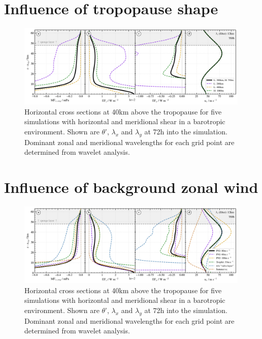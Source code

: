 \section{Influence of tropopause shape}
\begin{figure}[tbp]
    \centering
    \includegraphics[width=0.99\textwidth]{figures_q3D/TD-zprofiles-translbq3D_shape-T60h-avg.png}
    \caption{Horizontal cross sections at 40km above the tropopause for five simulations with horizontal and meridional shear in a barotropic environment. Shown are $\theta$', $\lambda_x$ and $\lambda_y$ at 72h into the simulation. Dominant zonal and meridional wavelengths for each grid point are determined from wavelet analysis.}
    \label{fig:q3D_shape}
\end{figure}


\section{Influence of background zonal wind}
\begin{figure}[tbp]
    \centering
    \includegraphics[width=0.99\textwidth]{figures_q3D/TD-zprofiles-translbq3D_wind-T60h-avg.png}
    \caption{Horizontal cross sections at 40km above the tropopause for five simulations with horizontal and meridional shear in a barotropic environment. Shown are $\theta$', $\lambda_x$ and $\lambda_y$ at 72h into the simulation. Dominant zonal and meridional wavelengths for each grid point are determined from wavelet analysis.}
    \label{fig:q3D_wind}
\end{figure}

